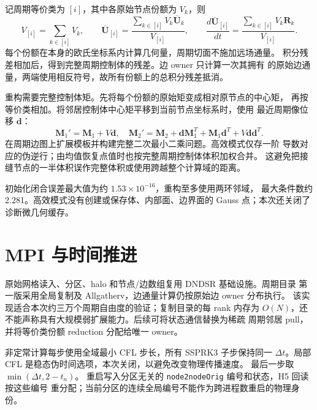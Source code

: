 \documentclass[UTF8,fontset=none,11pt,a4paper]{ctexart}
\begin{document}
记周期等价类为 $[i]$，其中各原始节点份额为 $V_k$，则
\[
V_{[i]}=\sum_{k\in[i]}V_k,\qquad
\overline{\boldsymbol U}_{[i]}=
\frac{\sum_{k\in[i]}V_k\overline{\boldsymbol U}_k}{V_{[i]}},\qquad
\frac{d\overline{\boldsymbol U}_{[i]}}{dt}=
\frac{\sum_{k\in[i]}V_k\boldsymbol R_k}{V_{[i]}}.
\]
每个份额在本身的欧氏坐标系内计算几何量，周期切面不施加远场通量。
积分残差相加后，得到完整周期控制体的残差。边 owner 只计算一次其拥有
的原始边通量，两端使用相反符号，故所有份额上的总积分残差抵消。

重构需要完整控制体矩。先将每个份额的原始矩变成相对原节点的中心矩，
再按等价类相加。将邻居控制体中心矩平移到当前节点坐标系时，使用
最近周期像位移 $\boldsymbol d$：
\[
\boldsymbol M_1'=\boldsymbol M_1+V\boldsymbol d,\quad
\boldsymbol M_2'=\boldsymbol M_2+
\boldsymbol d\boldsymbol M_1^T+\boldsymbol M_1\boldsymbol d^T+
V\boldsymbol d\boldsymbol d^T.
\]
在周期边图上扩展模板并构建完整二次最小二乘问题。高效模式仅存一阶
导数对应的伪逆行；由均值恢复点值时也按完整周期控制体体积加权合并。
这避免把接缝节点的一半体积误作完整体积或使用跨越整个计算域的距离。

初始化闭合误差最大值为约 $1.53\times10^{-16}$，重构至多使用两环邻域，
最大条件数约 2.281。高效模式没有创建或保存体、内部面、边界面的 Gauss
点；本次还关闭了诊断微几何缓存。

\section{MPI 与时间推进}
原始网格读入、分区、halo 和节点/边数组复用 DNDSR 基础设施。周期目录
第一版采用全局复制及 Allgatherv，边通量计算仍按原始边 owner 分布执行。
该实现适合本次约三万个周期自由度的验证；复制目录的每 rank 内存为
$O(N)$，还不能声称具有大规模弱扩展能力。后续可将状态通信替换为稀疏
周期邻居 pull，并将等价类份额 reduction 分配给唯一 owner。

非定常计算每步使用全域最小 CFL 步长，所有 SSPRK3 子步保持同一
$\Delta t$。局部 CFL 是稳态伪时间选项，本次关闭，以避免改变物理传播速度。
最后一步取 $\min(\Delta t,2-t_n)$。
重启写入分区无关的 \texttt{node2nodeOrig} 编号和状态，H5 回读按这些编号
重分配；当前分区的连续全局编号不能作为跨进程数重启的物理身份。
\end{document}
